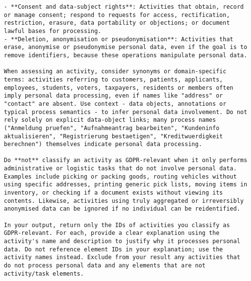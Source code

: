 \begin{lstlisting}[caption={System-Prompt fuer die DSGVO-Klassifikation von BPMN-Aktivitäten},label={lst:system-prompt}]
- **Consent and data-subject rights**: Activities that obtain, record or manage consent; respond to requests for access, rectification, restriction, erasure, data portability or objections; or document lawful bases for processing.
- **Deletion, anonymisation or pseudonymisation**: Activities that erase, anonymise or pseudonymise personal data, even if the goal is to remove identifiers, because these operations manipulate personal data.

When assessing an activity, consider synonyms or domain-specific terms: activities referring to customers, patients, applicants, employees, students, voters, taxpayers, residents or members often imply personal data processing, even if names like "address" or "contact" are absent. Use context - data objects, annotations or typical process semantics - to infer personal data involvement. Do not rely solely on explicit data-object links; many process names ("Anmeldung pruefen", "Aufnahmeantrag bearbeiten", "Kundeninfo aktualisieren", "Registrierung bestaetigen", "Kreditwuerdigkeit berechnen") themselves indicate personal data processing.

Do **not** classify an activity as GDPR-relevant when it only performs administrative or logistic tasks that do not involve personal data. Examples include picking or packing goods, routing vehicles without using specific addresses, printing generic pick lists, moving items in inventory, or checking if a document exists without viewing its contents. Likewise, activities using truly aggregated or irreversibly anonymised data can be ignored if no individual can be reidentified.

In your output, return only the IDs of activities you classify as GDPR-relevant. For each, provide a clear explanation using the activity's name and description to justify why it processes personal data. Do not reference element IDs in your explanation; use the activity names instead. Exclude from your result any activities that do not process personal data and any elements that are not activity/task elements.
\end{lstlisting}

